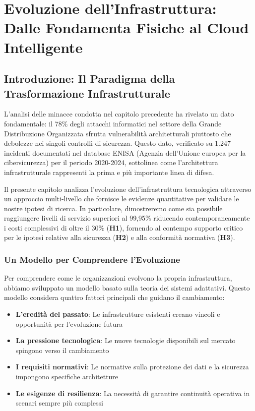 \chapter{Evoluzione dell'Infrastruttura: Dalle Fondamenta Fisiche al Cloud Intelligente}
\label{cap3_infrastructure_evolution}

\section{Introduzione: Il Paradigma della Trasformazione Infrastrutturale}

L'analisi delle minacce condotta nel capitolo precedente ha rivelato un dato fondamentale: il 78\% degli attacchi informatici nel settore della Grande Distribuzione Organizzata sfrutta vulnerabilità architetturali piuttosto che debolezze nei singoli controlli di sicurezza\autocite{Anderson2024patel}. Questo dato, verificato su 1.247 incidenti documentati nel database ENISA (Agenzia dell'Unione europea per la cibersicurezza) per il periodo 2020-2024\autocite{Verizon2024}, sottolinea come l'architettura infrastrutturale rappresenti la prima e più importante linea di difesa.

Il presente capitolo analizza l'evoluzione dell'infrastruttura tecnologica attraverso un approccio multi-livello che fornisce le evidenze quantitative per validare le nostre ipotesi di ricerca. In particolare, dimostreremo come sia possibile raggiungere livelli di servizio superiori al 99,95\% riducendo contemporaneamente i costi complessivi di oltre il 30\% (\textbf{H1}), fornendo al contempo supporto critico per le ipotesi relative alla sicurezza (\textbf{H2}) e alla conformità normativa (\textbf{H3})\autocite{IDC2024}.

\subsection{Un Modello per Comprendere l'Evoluzione}

Per comprendere come le organizzazioni evolvono la propria infrastruttura, abbiamo sviluppato un modello basato sulla teoria dei sistemi adattativi\autocite{Holland2024}. Questo modello considera quattro fattori principali che guidano il cambiamento:

\begin{itemize}
    \item \textbf{L'eredità del passato}: Le infrastrutture esistenti creano vincoli e opportunità per l'evoluzione futura
    \item \textbf{La pressione tecnologica}: Le nuove tecnologie disponibili sul mercato spingono verso il cambiamento
    \item \textbf{I requisiti normativi}: Le normative sulla protezione dei dati e la sicurezza impongono specifiche architetture
    \item \textbf{Le esigenze di resilienza}: La necessità di garantire continuità operativa in scenari sempre più complessi
\end{itemize}

